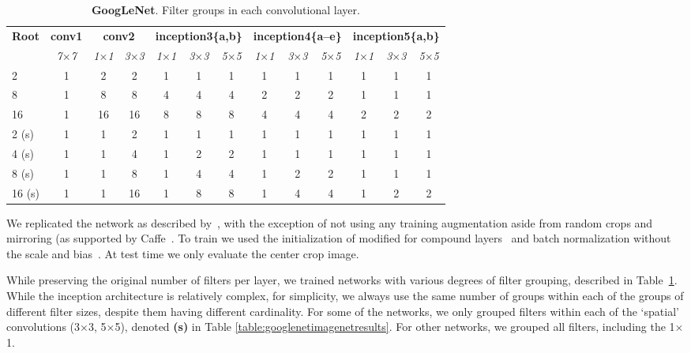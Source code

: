 \documentclass[thesis]{subfiles}
\begin{document}
	
	\begin{table}[tb]
		\caption[GoogLeNet root architectures]{\textbf{GoogLeNet}. Filter groups in each convolutional layer.}
		\label{table:googlenetconfig}
		\centering
		\tabcolsep=5pt
		\begin{tabular}{lcccccccccccc}
			\toprule
			\textbf{Root} & \textbf{conv1} & \multicolumn{2}{c}{\textbf{conv2}} & \multicolumn{3}{c}{\textbf{inception3\{a,b\}}} & \multicolumn{3}{c}{\textbf{inception4\{a--e\}}} & \multicolumn{3}{c}{\textbf{inception5\{a,b\}}} \\
			& \textit{7$\times$7} & \textit{1$\times$1} & \textit{3$\times$3} & \textit{1$\times$1} & \textit{3$\times$3} & \textit{5$\times$5} & \textit{1$\times$1} & \textit{3$\times$3} & \textit{5$\times$5} & \textit{1$\times$1} & \textit{3$\times$3} & \textit{5$\times$5} \\
			\midrule
			2  & 1 &  2 &  2 & 1 & 1 & 1 & 1 & 1 & 1 & 1 & 1 & 1\\
			8  & 1 &  8 &  8 & 4 & 4 & 4 & 2 & 2 & 2 & 1 & 1 & 1\\
			16 & 1 & 16 & 16 & 8 & 8 & 8 & 4 & 4 & 4 & 2 & 2 & 2\\
			\midrule
			2 (s)  & 1 &  1 &  2 & 1 & 1 & 1 & 1 & 1 & 1 & 1 & 1 & 1\\
			4 (s)  & 1 &  1 &  4 & 1 & 2 & 2 & 1 & 1 & 1 & 1 & 1 & 1\\
			8 (s)  & 1 &  1 &  8 & 1 & 4 & 4 & 1 & 2 & 2 & 1 & 1 & 1\\
			16 (s) & 1 &  1 & 16 & 1 & 8 & 8 & 1 & 4 & 4 & 1 & 2 & 2\\
			\bottomrule
		\end{tabular}
	\end{table}
	
	We replicated the network as described by~\citet{Szegedy2014going}, with the exception of not using any training augmentation aside from random crops and mirroring (as supported by Caffe~\cite{Jia2014}. To train we used the initialization of \citep{He2015b} modified for compound layers~\citep{Ioannou2016} and batch normalization without the scale and bias~\citep{Ioffe2015}. At test time we only evaluate the center crop image.
	
	While preserving the original number of filters per layer, we trained networks with various degrees of filter grouping, described in Table~\ref{table:googlenetconfig}.  While the inception architecture is relatively complex, for simplicity, we always use the same number of groups within each of the groups of different filter sizes, despite them having different cardinality. For some of the networks, we only grouped filters within each of the `spatial' convolutions (3$\times$3, 5$\times$5), denoted \textbf{(s)} in Table \ref{table:googlenetimagenetresults}. For other networks, we grouped all filters, including the 1$\times$1.
\end{document}
